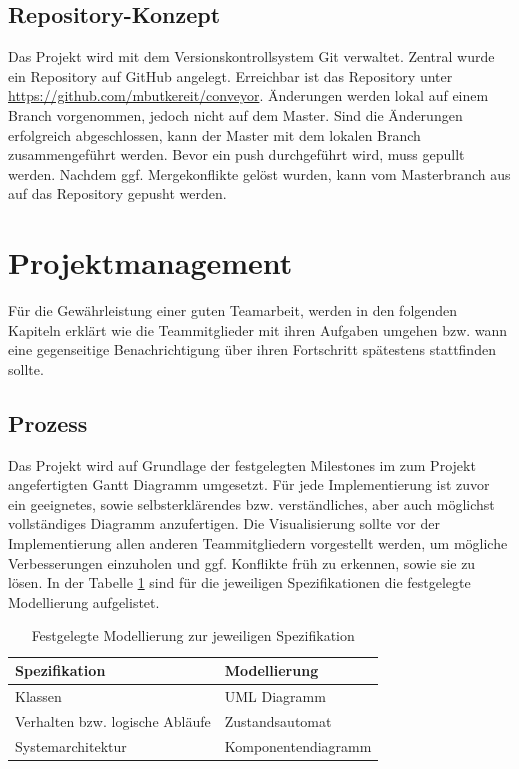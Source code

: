 \documentclass[a4paper, 11pt]{article}
\begin{document}
\newpage

\subsection{Repository-Konzept}
Das Projekt wird mit dem Versionskontrollsystem Git verwaltet. Zentral wurde ein Repository auf GitHub angelegt. Erreichbar ist das Repository unter \url{https://github.com/mbutkereit/conveyor}. Änderungen werden lokal auf einem Branch vorgenommen, jedoch nicht auf dem Master. Sind die Änderungen erfolgreich abgeschlossen, kann der Master mit dem lokalen Branch zusammengeführt werden. Bevor ein push durchgeführt wird, muss gepullt werden. Nachdem ggf. Mergekonflikte gelöst wurden, kann vom Masterbranch aus auf das Repository gepusht werden.

\section{Projektmanagement}
Für die Gewährleistung einer guten Teamarbeit, werden in den folgenden Kapiteln erklärt wie die Teammitglieder mit ihren Aufgaben umgehen bzw. wann eine gegenseitige Benachrichtigung über ihren Fortschritt spätestens stattfinden sollte.

\subsection{Prozess}
Das Projekt wird auf Grundlage der festgelegten Milestones im zum Projekt angefertigten Gantt Diagramm umgesetzt. Für jede Implementierung ist zuvor ein geeignetes, sowie selbsterklärendes bzw. verständliches, aber auch möglichst vollständiges Diagramm anzufertigen. Die Visualisierung sollte vor der Implementierung allen anderen Teammitgliedern vorgestellt werden, um mögliche Verbesserungen einzuholen und ggf. Konflikte früh zu erkennen, sowie sie zu lösen. In der Tabelle \ref{visuals} sind für die jeweiligen Spezifikationen die festgelegte Modellierung aufgelistet.

\begin{table}[h]
\centering
    \begin{tabularx}{\textwidth}{|l|X|}
    \hline
    \textbf{Spezifikation}&\textbf{Modellierung}\\
    \hline
    Klassen&UML Diagramm\\
    \hline
    Verhalten bzw. logische Abläufe&Zustandsautomat\\
    \hline
    Systemarchitektur&Komponentendiagramm\\
    \hline
    \end{tabularx}
\caption{Festgelegte Modellierung zur jeweiligen Spezifikation}
\label{visuals}
\end{table}
\end{document}
